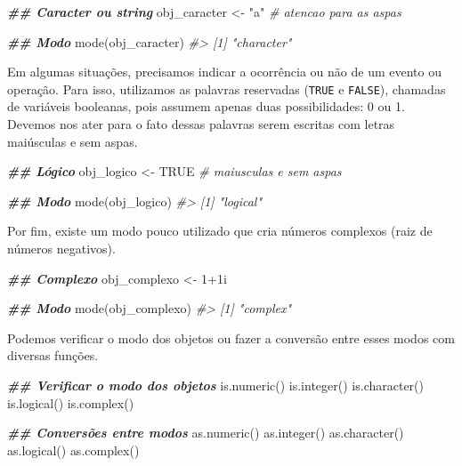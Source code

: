 \documentclass[
]{book}
\newenvironment{Shaded}{\begin{snugshade}}{\end{snugshade}}
\newcommand{\CommentTok}[1]{\textcolor[rgb]{0.37,0.37,0.37}{\textit{#1}}}
\newcommand{\ConstantTok}[1]{\textcolor[rgb]{0,0,0}{#1}}
\newcommand{\DecValTok}[1]{\textcolor[rgb]{0.06,0.06,0.06}{#1}}
\newcommand{\DocumentationTok}[1]{\textcolor[rgb]{0.37,0.37,0.37}{\textbf{\textit{#1}}}}
\newcommand{\FunctionTok}[1]{\textcolor[rgb]{0,0,0}{#1}}
\newcommand{\NormalTok}[1]{#1}
\newcommand{\OtherTok}[1]{\textcolor[rgb]{0.37,0.37,0.37}{#1}}
\newcommand{\SpecialCharTok}[1]{\textcolor[rgb]{0,0,0}{#1}}
\newcommand{\StringTok}[1]{\textcolor[rgb]{0.5,0.5,0.5}{#1}}
\begin{document}
\begin{Shaded}
\begin{Highlighting}[]
\DocumentationTok{\#\# Caracter ou string}
\NormalTok{obj\_caracter }\OtherTok{\textless{}{-}} \StringTok{"a"} \CommentTok{\# atencao para as aspas}

\DocumentationTok{\#\# Modo}
\FunctionTok{mode}\NormalTok{(obj\_caracter)}
\CommentTok{\#\textgreater{} [1] "character"}
\end{Highlighting}
\end{Shaded}

Em algumas situações, precisamos indicar a ocorrência ou não de um evento ou operação. Para isso, utilizamos as palavras reservadas (\texttt{TRUE} e \texttt{FALSE}), chamadas de variáveis booleanas, pois assumem apenas duas possibilidades: 0 ou 1. Devemos nos ater para o fato dessas palavras serem escritas com letras maiúsculas e sem aspas.

\begin{Shaded}
\begin{Highlighting}[]
\DocumentationTok{\#\# Lógico}
\NormalTok{obj\_logico }\OtherTok{\textless{}{-}} \ConstantTok{TRUE} \CommentTok{\# maiusculas e sem aspas}

\DocumentationTok{\#\# Modo}
\FunctionTok{mode}\NormalTok{(obj\_logico)}
\CommentTok{\#\textgreater{} [1] "logical"}
\end{Highlighting}
\end{Shaded}

Por fim, existe um modo pouco utilizado que cria números complexos (raiz de números negativos).

\begin{Shaded}
\begin{Highlighting}[]
\DocumentationTok{\#\# Complexo}
\NormalTok{obj\_complexo }\OtherTok{\textless{}{-}} \DecValTok{1}\SpecialCharTok{+}\NormalTok{1i}

\DocumentationTok{\#\# Modo}
\FunctionTok{mode}\NormalTok{(obj\_complexo)}
\CommentTok{\#\textgreater{} [1] "complex"}
\end{Highlighting}
\end{Shaded}

Podemos verificar o modo dos objetos ou fazer a conversão entre esses modos com diversas funções.

\begin{Shaded}
\begin{Highlighting}[]
\DocumentationTok{\#\# Verificar o modo dos objetos}
\FunctionTok{is.numeric}\NormalTok{()}
\FunctionTok{is.integer}\NormalTok{()}
\FunctionTok{is.character}\NormalTok{()}
\FunctionTok{is.logical}\NormalTok{()}
\FunctionTok{is.complex}\NormalTok{()}

\DocumentationTok{\#\# Conversões entre modos}
\FunctionTok{as.numeric}\NormalTok{()}
\FunctionTok{as.integer}\NormalTok{()}
\FunctionTok{as.character}\NormalTok{()}
\FunctionTok{as.logical}\NormalTok{()}
\FunctionTok{as.complex}\NormalTok{()}
\end{Highlighting}
\end{Shaded}
\end{document}
